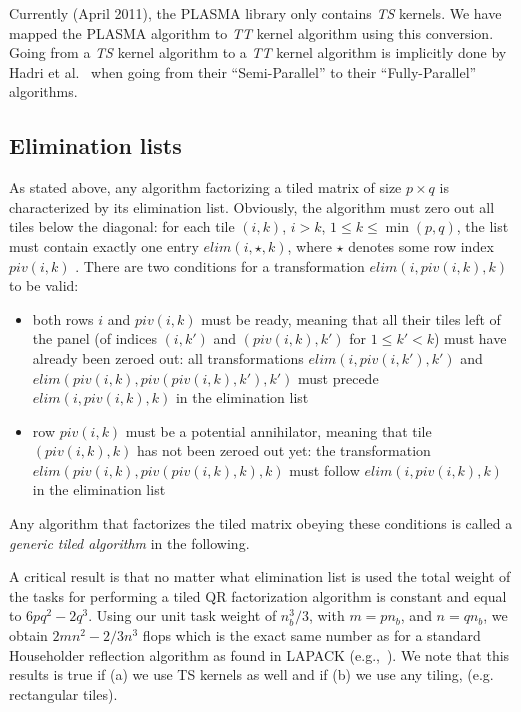 \documentclass[a4paper,twopages]{article}
\newcommand{\elim}{\mathit{elim}}
\newcommand{\s}{\ensuremath{\star}\xspace}
\begin{document}
Currently (April 2011), the PLASMA library only contains \emph{TS} kernels. We have
mapped the PLASMA algorithm to \emph{TT} kernel algorithm using this
conversion. Going from a \emph{TS} kernel algorithm to a \emph{TT} kernel
algorithm is implicitly done by Hadri et al.~\cite{Hadri_enhancingparallelism} when going
from their ``Semi-Parallel'' to their ``Fully-Parallel'' algorithms.

\subsection{Elimination lists}

As stated above, any algorithm factorizing a tiled matrix
of size $p \times q$ is characterized by its elimination list.
Obviously, the algorithm must zero out all tiles below the diagonal: for each tile $(i,k)$, $i>k$,
$1 \leq k \leq \min(p,q)$, the list must contain exactly one entry $\elim(i, \s, k)$, where \s denotes some
row index $piv(i,k)$ . There are two conditions for a transformation $\elim(i, piv(i,k), k)$ to be valid:
\begin{itemize}
  \item both rows $i$ and $piv(i,k)$ must be ready, meaning that all their tiles
      left of the panel (of indices $(i,k')$ and $(piv(i,k),k')$ for $1 \leq k' < k$)
      must have already been zeroed out: all transformations $\elim(i, piv(i,k'), k')$
       and $\elim(piv(i,k), piv(piv(i,k),k'), k')$ must precede
      $\elim(i, piv(i,k), k)$ in the elimination list
  \item row $piv(i,k)$ must be a potential annihilator, meaning that tile
      $(piv(i,k),k)$ has not been zeroed out yet: \newline the transformation
      $\elim(piv(i,k), piv(piv(i,k),k), k)$ must follow \linebreak $\elim(i, piv(i,k), k)$ in the elimination list
\end{itemize}
Any algorithm that factorizes the tiled
matrix obeying these conditions is called a \emph{generic tiled algorithm} in
the following.

A critical result is that no matter what elimination list is used the total
weight of the tasks for performing a tiled QR factorization algorithm is
constant and equal to $6 p q^2 - 2 q^3$. Using our unit task weight of $n_b^3/3$,
with $m = p n_b$, and $n=q n_b$, we obtain $2 mn^2 -2/3 n^3 $ flops which is the
exact same number as for a standard Householder reflection algorithm as found
in LAPACK (e.g.,~\cite{lawn41}).
We note that this results is true if (a) we use TS kernels as well
and if (b) we use any tiling, (e.g. rectangular tiles).
\end{document}
